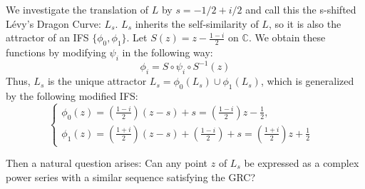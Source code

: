 \documentclass[epsf,10pt]{article}
\begin{document}
We investigate the translation of $L$ by $s=-1/2+i/2$ and call this the s-shifted L\'evy's Dragon Curve: $L_s$. $L_s$ inherits the self-similarity of $L$, so it is also the attractor of an IFS $\{\phi_0, \phi_1\}$. Let $S(z)=z-\frac{1-i}{2}$ on $\mathbb{C}$.
We obtain these functions by modifying $\psi_i$ in the following way:
\begin{equation*}
\phi_i = S \circ \psi_i \circ S^{-1}(z)
\end{equation*}
Thus, $L_s$ is the unique attractor $L_s=\phi_0(L_s)\cup\phi_1(L_s)$, which is  generalized by the following modified IFS: 
\begin{equation}
\label{eq:s-levy}
\begin{cases}
 \phi_0(z)=(\frac{1-i}{2})(z-s)+s = (\frac{1-i}{2}) z-\frac{1}{2},& \\
 \phi_1(z)=(\frac{1+i}{2})(z-s) + (\frac{1-i}{2})+s = (\frac{1+i}{2}) z +\frac{1}{2}&
\end{cases}
\end{equation}

Then a natural question arises: Can any point $z$ of $L_s$ be expressed as a complex power series with a similar sequence satisfying the GRC?
\end{document}
